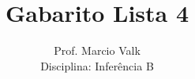 \documentclass[10pt,brazil]{exam}
\begin{document}
\title{Gabarito Lista 4 }


\author{
  Prof. Marcio Valk \\
  Disciplina: Inferência B\\
  \date{}
}


\maketitle
\end{document}
